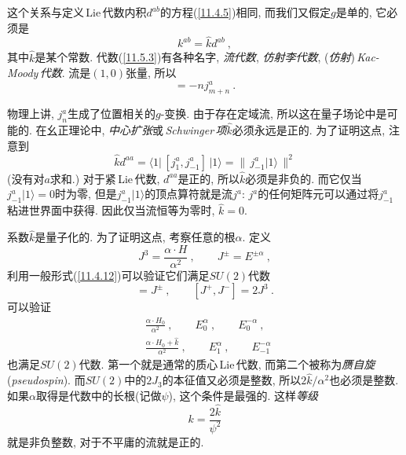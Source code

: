 \noindent 这个关系与定义\,Lie\,代数内积$ d^{ab} $的方程(\ref{11.4.5})相同, 而我们又假定$ g $是单的, 它必须是
\begin{equation}
    k^{ab}=\hat{k}d^{ab} \:, \label{11.5.7}
\end{equation}
其中$ \hat{k} $是某个常数. 代数(\ref{11.5.3})有各种名字, {\emph{流代数}}, {\emph{仿射李代数}}, ({\emph{仿射}})\,\emph{Kac-Moody}\,{\emph{代数}}. 流是$ (1,0) $张量, 所以
\begin{equation}
    [L_{m},j_{n}^{a}] = -nj_{m+n}^{a} \:. \label{11.5.8}
\end{equation}

物理上讲, $j_{n}^{a} $生成了位置相关的$ g $-变换. 由于存在定域流, 所以这在量子场论中是可能的. 在幺正理论中, {\emph{中心扩张}}或\emph{\,Schwinger\,}{\emph{项}}$ \hat{k} $必须永远是正的. 为了证明这点, 注意到
\begin{equation}
\hat{k}d^{aa}= \langle 1\rvert\,[j_{1}^{a},j_{-1}^{a}]\,\lvert 1 \rangle = \lVert\,j_{-1}^{a}\lvert1\rangle\,\rVert^{2}  \label{11.5.9}
\end{equation}
(没有对$ a $求和.) 对于紧\,Lie\,代数, $d^{aa} $是正的, 所以$ \hat{k} $必须是非负的. 而它仅当$ j_{-1}^{a}\lvert1\rangle=0 $时为零, 但是$ j_{-1}^{a}\lvert1\rangle $的顶点算符就是流$ j^{a} $: $j^{a} $的任何矩阵元可以通过将$ j_{-1}^{a} $粘进世界面中获得. 因此仅当流恒等为零时, $\hat{k}=0$.

系数$ \hat{k} $是量子化的. 为了证明这点, 考察任意的根$ \alpha$. 定义
\begin{equation}
    J^{3} =\frac{\alpha\cdot H}{\alpha^{2}}\:, \qquad J^{\pm}=E^{\pm\alpha} \:, \label{11.5.10}
\end{equation}
利用一般形式(\ref{11.4.12})可以验证它们满足$ SU(2) $代数
\begin{equation}
    [J^{3},J^{\pm}]=J^{\pm}\:, \qquad [J^{+},J^{-}]=2J^{3} \:. \label{11.5.11}
\end{equation}
可以验证
\begin{subequations}
\begin{align}
    &\frac{\alpha\cdot H_{0}}{\alpha^{2}}\:, \qquad E_{0}^{\alpha}\:,\qquad E_{0}^{-\alpha} \:, \label{11.5.12a}\\
    &\frac{\alpha\cdot H_{0}+\hat{k}}{\alpha^{2}}\:, \qquad E_{1}^{\alpha}\:, \qquad E_{-1}^{-\alpha} \:\label{11.5.12b}
\end{align} \label{15.5.12}
\end{subequations}
也满足$ SU(2) $代数. 第一个就是通常的质心\,Lie\,代数, 而第二个被称为{\emph{赝自旋}}(\emph{pseudospin}). 而$ SU(2) $中的$ 2J_{3} $的本征值又必须是整数, 所以$ 2\hat{k}/\alpha^{2} $也必须是整数.如果$ \alpha $取得是代数中的长根(记做$ \psi $), 这个条件是最强的. 这样{\emph{等级}}
\begin{equation}
    k=\frac{2\hat{k}}{\psi^{2}} \label{11.5.13}
\end{equation}
就是非负整数, 对于不平庸的流就是正的.

